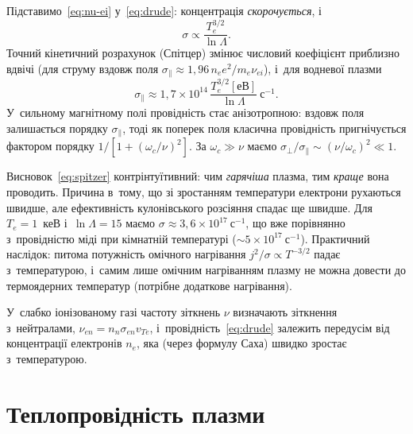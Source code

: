 Підставимо~\eqref{eq:nu-ei} у~\eqref{eq:drude}: концентрація \emph{скорочується}, і
\begin{equation}\label{eq:spitzer}
	\sigma\propto\frac{T_e^{3/2}}{\ln\Lambda}.
\end{equation}
Точний кінетичний розрахунок (Спітцер) змінює числовий коефіцієнт приблизно вдвічі (для
струму вздовж поля $\sigma_\parallel\approx1{,}96\,n_ee^2/m_e\nu_{ei}$), і~для водневої
плазми
\begin{equation*}
	\sigma_\parallel\approx1{,}7\times10^{14}\,\frac{T_e^{3/2}[\text{еВ}]}{\ln\Lambda}~\mathrm{с}^{-1}.
\end{equation*}
У~сильному магнітному полі провідність стає анізотропною: вздовж поля залишається порядку
$\sigma_\parallel$, тоді як поперек поля класична провідність пригнічується фактором
порядку $1/[1+(\omega_c/\nu)^2]$. За $\omega_c\gg\nu$ маємо
$\sigma_\perp/\sigma_\parallel\sim(\nu/\omega_c)^2\ll1$.

Висновок~\eqref{eq:spitzer} контрінтуїтивний: чим \emph{гарячіша} плазма, тим \emph{краще}
вона проводить. Причина в~тому, що зі зростанням температури електрони рухаються швидше,
але ефективність кулонівського розсіяння спадає ще швидше. Для $T_e=1$~кеВ
і~$\ln\Lambda=15$ маємо $\sigma\approx3{,}6\times10^{17}~\mathrm{с}^{-1}$, що вже
порівнянно з~провідністю міді при кімнатній температурі
($\sim5\times10^{17}~\mathrm{с}^{-1}$). Практичний наслідок: питома потужність омічного
нагрівання $j^2/\sigma\propto T^{-3/2}$ падає з~температурою, і~самим лише омічним
нагріванням плазму не можна довести до термоядерних температур (потрібне додаткове
нагрівання).

У~слабко іонізованому газі частоту зіткнень $\nu$ визначають зіткнення з~нейтралами,
$\nu_{en}=n_n\sigma_{en}v_{Te}$, і~провідність~\eqref{eq:drude} залежить передусім від
концентрації електронів $n_e$, яка (через формулу Саха) швидко зростає з~температурою.



\section{Теплопровідність плазми}



